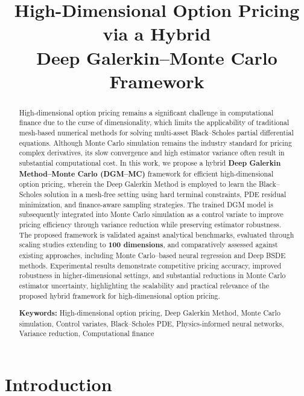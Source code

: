 \documentclass[12pt, a4paper]{article}
\title{%
    \textbf{High-Dimensional Option Pricing via a Hybrid\\
    Deep Galerkin--Monte Carlo Framework}
}
\author{}
\date{}
\begin{document}
\maketitle
\thispagestyle{empty}

\begin{abstract}
High-dimensional option pricing remains a significant challenge in
computational finance due to the curse of dimensionality, which limits
the applicability of traditional mesh-based numerical methods for
solving multi-asset Black--Scholes partial differential equations.
Although Monte Carlo simulation remains the industry standard for
pricing complex derivatives, its slow convergence and high estimator
variance often result in substantial computational cost. In this work,
we propose a hybrid \textbf{Deep Galerkin Method--Monte Carlo
(DGM--MC)} framework for efficient high-dimensional option pricing,
wherein the Deep Galerkin Method is employed to learn the
Black--Scholes solution in a mesh-free setting using hard terminal
constraints, PDE residual minimization, and finance-aware sampling
strategies. The trained DGM model is subsequently integrated into
Monte Carlo simulation as a control variate to improve pricing
efficiency through variance reduction while preserving estimator
robustness. The proposed framework is validated against analytical
benchmarks, evaluated through scaling studies extending to
\textbf{100 dimensions}, and comparatively assessed against existing
approaches, including Monte Carlo--based neural regression and Deep
BSDE methods. Experimental results demonstrate competitive pricing
accuracy, improved robustness in higher-dimensional settings, and
substantial reductions in Monte Carlo estimator uncertainty,
highlighting the scalability and practical relevance of the proposed
hybrid framework for high-dimensional option pricing.

\medskip
\noindent\textbf{Keywords:} High-dimensional option pricing, Deep
Galerkin Method, Monte Carlo simulation, Control variates,
Black--Scholes PDE, Physics-informed neural networks, Variance
reduction, Computational finance
\end{abstract}

\newpage
\tableofcontents
\newpage

\section{Introduction}
\end{document}
